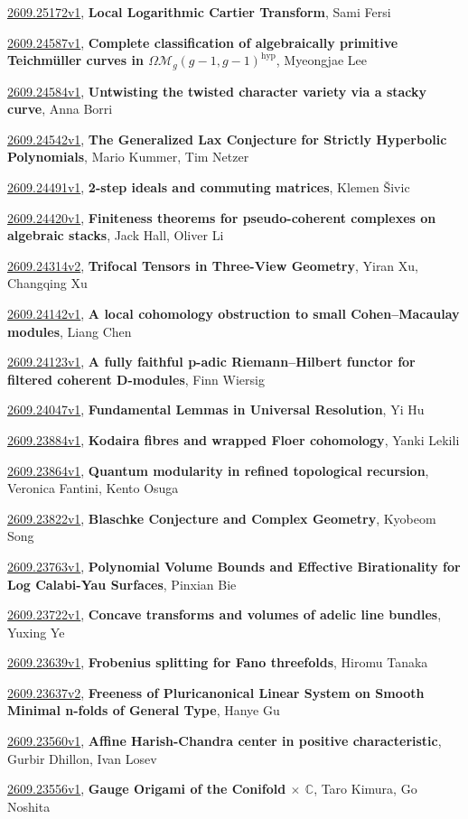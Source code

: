 \documentclass[9pt, a4paper]{article}
\theoremstyle{plain}
\theoremstyle{definition}
\theoremstyle{remark}
\newcommand{\arxiv}[3]{\href{https://arxiv.org/abs/#1}{#1}, \textbf{\textcolor{arxivblue}{#2}}, #3}
\begin{document}
\arxiv{2609.25172v1}{Local Logarithmic Cartier Transform}{Sami Fersi}

\arxiv{2609.24587v1}{Complete classification of algebraically primitive Teichmüller curves in $Ω\mathcal{M}_g(g-1,g-1)^{\mathrm{hyp}}$}{Myeongjae Lee}

\arxiv{2609.24584v1}{Untwisting the twisted character variety via a stacky curve}{Anna Borri}

\arxiv{2609.24542v1}{The Generalized Lax Conjecture for Strictly Hyperbolic Polynomials}{Mario Kummer, Tim Netzer}

\arxiv{2609.24491v1}{2-step ideals and commuting matrices}{Klemen Šivic}

\arxiv{2609.24420v1}{Finiteness theorems for pseudo-coherent complexes on algebraic stacks}{Jack Hall, Oliver Li}

\arxiv{2609.24314v2}{Trifocal Tensors in Three-View Geometry}{Yiran Xu, Changqing Xu}

\arxiv{2609.24142v1}{A local cohomology obstruction to small Cohen--Macaulay modules}{Liang Chen}

\arxiv{2609.24123v1}{A fully faithful p-adic Riemann--Hilbert functor for filtered coherent D-modules}{Finn Wiersig}

\arxiv{2609.24047v1}{Fundamental Lemmas in Universal Resolution}{Yi Hu}

\arxiv{2609.23884v1}{Kodaira fibres and wrapped Floer cohomology}{Yanki Lekili}

\arxiv{2609.23864v1}{Quantum modularity in refined topological recursion}{Veronica Fantini, Kento Osuga}

\arxiv{2609.23822v1}{Blaschke Conjecture and Complex Geometry}{Kyobeom Song}

\arxiv{2609.23763v1}{Polynomial Volume Bounds and Effective Birationality for Log Calabi-Yau Surfaces}{Pinxian Bie}

\arxiv{2609.23722v1}{Concave transforms and volumes of adelic line bundles}{Yuxing Ye}

\arxiv{2609.23639v1}{Frobenius splitting for Fano threefolds}{Hiromu Tanaka}

\arxiv{2609.23637v2}{Freeness of Pluricanonical Linear System on Smooth Minimal n-folds of General Type}{Hanye Gu}

\arxiv{2609.23560v1}{Affine Harish-Chandra center in positive characteristic}{Gurbir Dhillon, Ivan Losev}

\arxiv{2609.23556v1}{Gauge Origami of the Conifold $\times$ $\mathbb{C}$}{Taro Kimura, Go Noshita}
\end{document}
